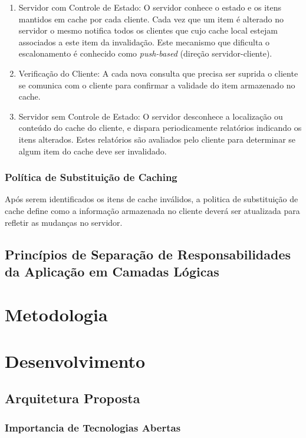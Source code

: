 \documentclass[
	article,			%
	11pt,				%
	oneside,			%
	a4paper,			%
	english,			%
	brazil,				%
	sumario=tradicional
]{abntex2}
\begin{document}
\begin{enumerate}
	\item Servidor com Controle de Estado: O servidor conhece o estado e os itens mantidos em cache por cada cliente. Cada vez que um item é alterado no servidor o mesmo notifica todos os clientes que cujo cache local estejam associados a este item da invalidação. Este mecanismo que dificulta o escalonamento é conhecido como \emph{push-based} (direção servidor-cliente).
	\item Verificação do Cliente: A cada nova consulta que precisa ser suprida o cliente se comunica com o cliente para confirmar a validade do item armazenado no cache.
	\item Servidor sem Controle de Estado: O servidor desconhece a localização ou conteúdo do cache do cliente, e dispara periodicamente relatórios indicando os itens alterados. Estes relatórios são avaliados pelo cliente para determinar se algum item do cache deve ser invalidado.
\end{enumerate}

\subsection{Política de Substituição de Caching}
Após serem identificados os itens de cache inválidos, a politica de substituição de cache define como a informação armazenada no cliente deverá ser atualizada para refletir as mudanças no servidor.

\section{Princípios de Separação de Responsabilidades da Aplicação em Camadas Lógicas}

\chapter{Metodologia}

\chapter{Desenvolvimento}

\section{Arquitetura Proposta}

\subsection{Importancia de Tecnologias Abertas}
\end{document}
